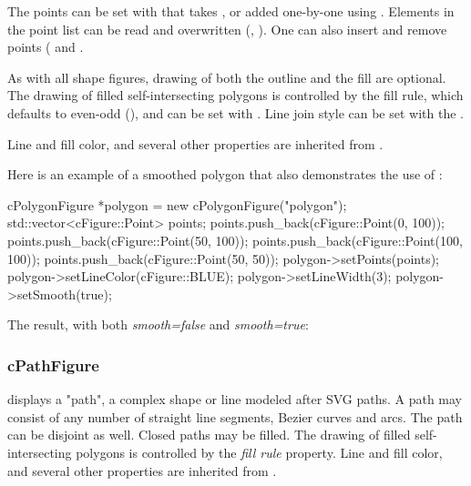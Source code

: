 The points can be set with  that takes ,
or added one-by-one using . Elements in the point list can be
read and overwritten (, ). One can also
insert and remove points ( and .

As with all shape figures, drawing of both the outline and the fill
are optional. The drawing of filled self-intersecting polygons is controlled
by the fill rule, which defaults to even-odd (), and
can be set with . Line join style can be set with
the .

Line and fill color, and several other properties are inherited from
.

Here is an example of a smoothed polygon that also demonstrates
the use of :

\begin{cpp}
cPolygonFigure *polygon = new cPolygonFigure("polygon");
std::vector<cFigure::Point> points;
points.push_back(cFigure::Point(0, 100));
points.push_back(cFigure::Point(50, 100));
points.push_back(cFigure::Point(100, 100));
points.push_back(cFigure::Point(50, 50));
polygon->setPoints(points);
polygon->setLineColor(cFigure::BLUE);
polygon->setLineWidth(3);
polygon->setSmooth(true);
\end{cpp}


The result, with both \textit{smooth=false} and \textit{smooth=true}:

\begin{center}

\end{center}


\subsubsection{cPathFigure}
\label{sec:graphics:pathfigure}

 displays a "path", a complex shape or line modeled after SVG
paths. A path may consist of any number of straight line segments, Bezier
curves and arcs. The path can be disjoint as well. Closed paths may be filled.
The drawing of filled self-intersecting polygons is controlled by the
\textit{fill rule} property. Line and fill color, and several other properties
are inherited from .

